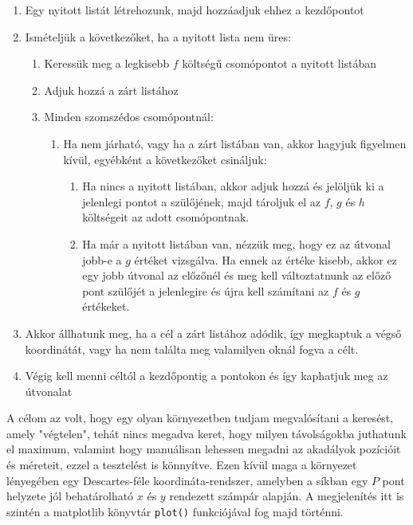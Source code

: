 
\begin{enumerate}
	\item Egy nyitott listát létrehozunk, majd hozzáadjuk ehhez a kezdőpontot
	\item Ismételjük a következőket, ha a nyitott lista nem üres:
	\begin{enumerate}
		\item Keressük meg a legkisebb $ f $ költségű csomópontot a nyitott listában
		\item Adjuk hozzá a zárt listához
		\item Minden szomszédos csomópontnál:
			\begin{enumerate}
				\item Ha nem járható, vagy ha a zárt listában van, akkor hagyjuk figyelmen kívül, egyébként a következőket csináljuk:
					\begin{enumerate}
						\item Ha nincs a nyitott listában, akkor adjuk hozzá és jelöljük ki a jelenlegi pontot a szülőjének, majd tároljuk el az $ f $, $ g $ és $ h $ költségeit az adott csomópontnak.
						\item Ha már a nyitott listában van, nézzük meg, hogy ez az útvonal jobb-e a $ g $ értéket vizsgálva. Ha ennek az értéke kisebb, akkor ez egy jobb útvonal az előzőnél és meg kell változtatnunk az előző pont szülőjét a jelenlegire és újra kell számítani az $ f $ és $ g $ értékeket.  
					\end{enumerate}
			\end{enumerate}
	\end{enumerate}
	\item Akkor állhatunk meg, ha a cél a zárt listához adódik, így megkaptuk a végső koordinátát, vagy ha nem találta meg valamilyen oknál fogva a célt. 
	\item Végig kell menni céltól a kezdőpontig a pontokon és így kaphatjuk meg az útvonalat
\end{enumerate}


A célom az volt, hogy egy olyan környezetben tudjam megvalósítani a keresést, amely "végtelen", tehát nincs megadva keret, hogy milyen távolságokba juthatunk el maximum, valamint hogy manuálisan lehessen megadni az akadályok pozícióit és méreteit, ezzel a tesztelést is könnyítve. Ezen kívül maga a környezet lényegében egy Descartes-féle koordináta-rendszer, amelyben a síkban egy $ P $ pont helyzete jól behatárolható $ x $ és $ y $ rendezett számpár alapján. A megjelenítés itt is szintén a matplotlib könyvtár \texttt{plot()} funkciójával fog majd történni.


